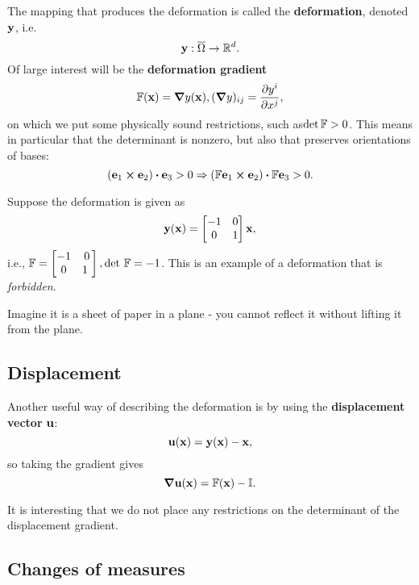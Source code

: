 \documentclass[reqno, a4paper]{article}
\begin{document}
The mapping that produces the deformation is called the \textbf{deformation}, denoted $\vb{y}$, i.e.
\[
	\vb{y}: \overline{\Omega} \to {\mathbb R}^d.
\]
Of large interest will be the \textbf{deformation gradient}
\[
	\mathbb{F}(\vb{x}) = \grad{y}(\vb{x}), (\grad{y})_{ij}=\pdv{y^i}{x^j},
\]
on which we put some physically sound restrictions, such as$\det \mathbb{F}> 0$. This means in particular that the determinant is nonzero, but also that preserves orientations of bases:
\[
(\vb{e}_1 \cross \vb{e}_2) \vdot \vb{e}_3 > 0 \Rightarrow(\fgrad\vb{e}_1 \cross \vb{e}_2) \vdot \fgrad \vb{e}_3 >0.
\]

\begin{example}
	Suppose the deformation is given as
	\[
		\vb{y}(\vb{x}) = \begin{bmatrix}-1 & 0 \\ 0 & 1\end{bmatrix} \vb{x},
	\]
i.e., $\fgrad=\begin{bmatrix}-1 & 0 \\ 0 & 1\ \end{bmatrix}, \detf = -1$. This is an example of a deformation that is \textit{forbidden}.

Imagine it is a sheet of paper in a plane - you cannot reflect it without lifting it from the plane.
\end{example}

\subsection{Displacement}
\label{sec:displacement}
Another useful way of describing the deformation is by using the \textbf{displacement vector} $\vb{u}$:
\[
	\vb{u}(\vb{x}) = \vb{y}(\vb{x}) - \vb{x},
\]
so taking the gradient gives
\[
	\grad{\vb{u}(\vb{x})} = \mathbb{F}(\vb{x}) - \mathbb{I}.
\]
\begin{remark}
It is interesting that we do not place any restrictions on the determinant of the displacement gradient.
\end{remark}

\subsection{Changes of measures}
\label{sec:changes}
\end{document}
